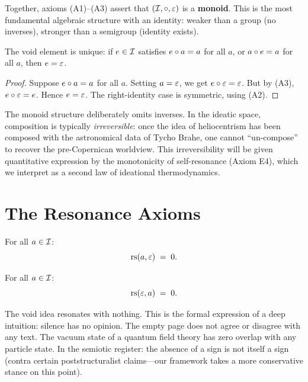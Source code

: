 Together, axioms (A1)--(A3) assert that $(\mathcal{I}, \circ, \varepsilon)$ is a
\textbf{monoid}. This is the most fundamental algebraic structure with
an identity: weaker than a group (no inverses), stronger than a semigroup
(identity exists).

\begin{proposition}\label{prop:void-unique}
The void element is unique: if $e \in \mathcal{I}$ satisfies $e \circ a = a$
for all $a$, or $a \circ e = a$ for all $a$, then $e = \varepsilon$.
\end{proposition}
\begin{proof}
Suppose $e \circ a = a$ for all $a$. Setting $a = \varepsilon$, we get
$e \circ \varepsilon = \varepsilon$. But by (A3), $e \circ \varepsilon = e$. Hence
$e = \varepsilon$. The right-identity case is symmetric, using (A2).
\end{proof}

\begin{remark}
The monoid structure deliberately omits inverses. In the ideatic space,
composition is typically \emph{irreversible}: once the idea of heliocentrism
has been composed with the astronomical data of Tycho Brahe, one cannot
``un-compose'' to recover the pre-Copernican worldview. This irreversibility
will be given quantitative expression by the monotonicity of self-resonance
(Axiom E4), which we interpret as a second law of ideational thermodynamics.
\end{remark}

\section{The Resonance Axioms}

\begin{axiom_def}
For all $a \in \mathcal{I}$:
\[
    \mathrm{rs}(a, \varepsilon) \;=\; 0.
\]
\end{axiom_def}

\begin{axiom_def}
For all $a \in \mathcal{I}$:
\[
    \mathrm{rs}(\varepsilon, a) \;=\; 0.
\]
\end{axiom_def}

\begin{interpretation}
The void idea resonates with nothing. This is the formal expression of
a deep intuition: silence has no opinion. The empty page does not agree
or disagree with any text. The vacuum state of a quantum field theory
has zero overlap with any particle state. In the semiotic register:
the absence of a sign is not itself a sign (contra certain
poststructuralist claims---our framework takes a more conservative
stance on this point).
\end{interpretation}

